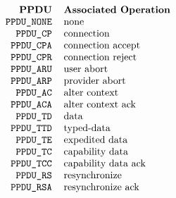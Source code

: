 
\normalsize
\[\begin{tabular}{rp{3.0in}}
\bf PPDU&		\bf Associated Operation\\
\tt PPDU\_NONE&		none\\
\tt PPDU\_CP&		connection\\
\tt PPDU\_CPA&		connection accept\\
\tt PPDU\_CPR&		connection reject\\
\tt PPDU\_ARU&		user abort\\
\tt PPDU\_ARP&		provider abort\\
\tt PPDU\_AC&		alter context\\
\tt PPDU\_ACA&		alter context ack\\
\tt PPDU\_TD&		data\\
\tt PPDU\_TTD&		typed-data\\
\tt PPDU\_TE&		expedited data\\
\tt PPDU\_TC&		capability data\\
\tt PPDU\_TCC&		capability data ack\\
\tt PPDU\_RS&		resynchronize\\
\tt PPDU\_RSA&		resynchronize ack
\end{tabular}\]
